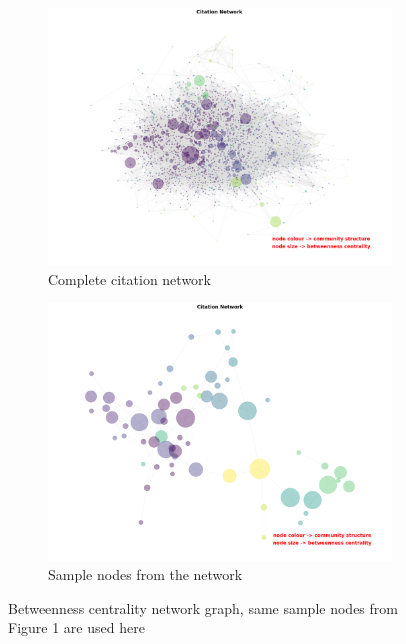 \documentclass{article}
\begin{document}
\begin{figure}[h]
\centering
\begin{subfigure}[b]{0.48\textwidth}
    \centering
    \includegraphics[width=\textwidth]{Figures/Betweenness Centrality.png}
    \caption{Complete citation network}
    \label{fig:network_graph}
\end{subfigure}
\hfill
\begin{subfigure}[b]{0.48\textwidth}
    \centering
    \includegraphics[width=\textwidth]{Figures/Sample Betweenness.png}
    \caption{Sample nodes from the network}
    \label{fig:sample_network}
\end{subfigure}
\caption{Betweenness centrality network graph, same sample nodes from Figure 1 are used here}
\label{fig:combined}
\end{figure}
\end{document}
